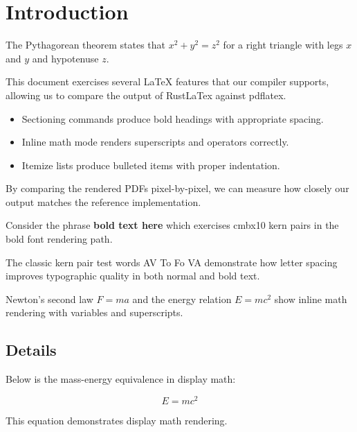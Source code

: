 \documentclass{article}
\begin{document}
\section{Introduction}

The Pythagorean theorem states that $x^2 + y^2 = z^2$ for a right triangle
with legs $x$ and $y$ and hypotenuse $z$.

This document exercises several LaTeX features that our compiler supports,
allowing us to compare the output of RustLaTex against pdflatex.

\begin{itemize}
  \item Sectioning commands produce bold headings with appropriate spacing.
  \item Inline math mode renders superscripts and operators correctly.
  \item Itemize lists produce bulleted items with proper indentation.
\end{itemize}

By comparing the rendered PDFs pixel-by-pixel, we can measure how closely
our output matches the reference implementation.

Consider the phrase \textbf{bold text here} which exercises cmbx10 kern pairs
in the bold font rendering path.

The classic kern pair test words AV To Fo VA demonstrate how letter spacing
improves typographic quality in both normal and bold text.

Newton's second law $F = ma$ and the energy relation $E = mc^2$ show
inline math rendering with variables and superscripts.

\subsection{Details}

Below is the mass-energy equivalence in display math:

\[ E = mc^2 \]

This equation demonstrates display math rendering.
\end{document}
